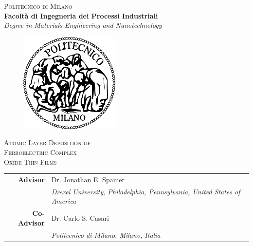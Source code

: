 \thispagestyle{empty}
\begin{titlepage}
\vspace*{-3cm}
\begin{center}
  {\LARGE
  \textsc{Politecnico di Milano}\\
  \textbf{\Large
  Facolt\`a di Ingegneria dei Processi Industriali}\\
  \emph{\large Degree in Materials Engineering and Nanotechnology}}\\
  \vspace*{0.5cm}
  \begin{figure}[htbp]
    \begin{center}
      \includegraphics[width=5cm]{./pictures/logopm.png}
    \end{center}
  \end{figure}
  \vspace{-0.3cm}
   {\huge\textsc{
  Atomic Layer Deposition of \\
  Ferroelectric Complex\\Oxide Thin Films\\
  }}

  
  
\end{center}
\vspace{0.3cm} 
\large
\begin{flushleft}

\begin{tabular*}{0.75\textwidth}{>{\bfseries}r l}
  Advisor & Dr. Jonathan E. Spanier \\
  & \emph{\small Drexel University, Philadelphia, Pennsylvania, United States of America}\\
  Co-Advisor  & Dr. Carlo S. Casari \\
  & \emph{\small Politecnico di Milano, Milano, Italia}
  \vspace{0.3cm}
\end{tabular*}



\end{flushleft}
\end{titlepage}
